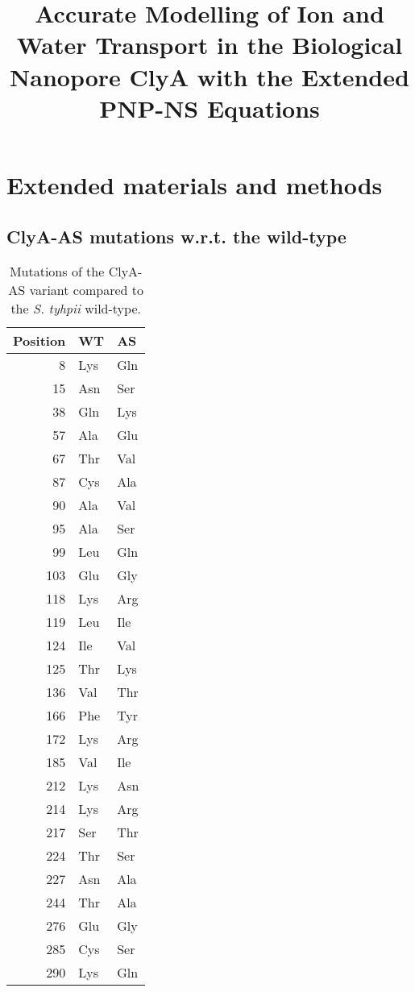\documentclass[journal=ancac3, manuscript=suppinfo, etalmode=truncate,maxauthors=0]{achemso}
\title{Accurate Modelling of Ion and Water Transport in the Biological Nanopore ClyA with the Extended PNP-NS Equations}
\begin{document}
\maketitle

\newpage

\tableofcontents

\newpage

\newpage
\section{Extended materials and methods}

\subsection{ClyA-AS mutations w.r.t. the wild-type}

\begin{table*}[h]
	\renewcommand{\arraystretch}{1.5}
	\scriptsize
	\caption{Mutations of the ClyA-AS variant compared to the \textit{S. tyhpii} wild-type.}
	\centering
	\label{tab:clya_as_mutations}
	\begin{tabular}{rll}
		\toprule
		Position	& WT	& AS \\
		\midrule
		8			& Lys	& Gln	\\
		15			& Asn	& Ser	\\
		38			& Gln	& Lys	\\
		57			& Ala	& Glu 	\\
		67			& Thr	& Val 	\\
		87			& Cys	& Ala 	\\
		90			& Ala	& Val	\\
		95			& Ala	& Ser 	\\
		99			& Leu	& Gln 	\\
		103	 		& Glu	& Gly	\\
		118			& Lys	& Arg 	\\
		119			& Leu	& Ile	\\
		124			& Ile	& Val	\\
		125			& Thr	& Lys	\\
		136			& Val	& Thr	\\
		166			& Phe	& Tyr	\\
		172			& Lys	& Arg	\\
		185			& Val	& Ile	\\
		212			& Lys	& Asn	\\
		214			& Lys	& Arg	\\
		217			& Ser	& Thr	\\
		224			& Thr	& Ser	\\
		227			& Asn	& Ala	\\
		244			& Thr 	& Ala	\\
		276			& Glu	& Gly	\\
		285			& Cys	& Ser	\\
		290			& Lys	& Gln	\\
		\bottomrule
	\end{tabular}
\end{table*}
\end{document}
